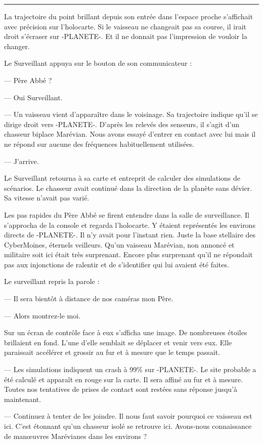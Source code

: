 \documentclass[ebook,12pt,oneside,onecolumn,openright,draft]{memoir}
\begin{document}
\fancybreak{\pfbreakdisplay}

La trajectoire du point brillant depuis son entrée dans l'espace proche
s'affichait avec précision sur l'holocarte. Si le vaisseau ne changeait pas sa
course, il irait droit s'écraser sur -PLANETE-. Et il ne donnait pas
l'impression de vouloir la changer.

Le Surveillant appuya sur le bouton de son communicateur :

  --- Père Abbé ?

  --- Oui Surveillant.

  --- Un vaisseau vient d'apparaître dans le voisinage. Sa trajectoire indique
qu'il se dirige droit vers -PLANETE-. D'après les relevés des senseurs, il
s'agit d'un chasseur biplace Marévian. Nous avons essayé d'entrer en contact
avec lui mais il ne répond sur aucune des fréquences habituellement utilisées.

  --- J'arrive.

Le Surveillant retourna à sa carte et entreprit de calculer des simulations
de scénarios. Le chasseur avait continué dans la direction de la planète sans
dévier. Sa vitesse n'avait pas varié.

Les pas rapides du Père Abbé se firent entendre dans la salle de surveillance.
Il s'approcha de la console et regarda l'holocarte. Y étaient représentés les
environs directs de -PLANETE-. Il n'y avait pour l'instant rien. Juste la base
stellaire des CyberMoines, éternels veilleurs. Qu'un vaisseau Marévian, non
annoncé et militaire soit ici était très surprenant. Encore plus surprenant
qu'il ne répondait pas aux injonctions de ralentir et de s'identifier qui lui
avaient été faites.

Le surveillant repris la parole :

  --- Il sera bientôt à distance de nos caméras mon Père.

  --- Alors montrez-le moi.

Sur un écran de contrôle face à eux s'afficha une image. De nombreuses étoiles
brillaient en fond. L'une d'elle semblait se déplacer et venir vers eux. Elle
paraissait accélérer et grossir au fur et à mesure que le temps passait.

  --- Les simulations indiquent un crash à 99\% sur -PLANETE-. Le site probable
 a été calculé et apparaît en rouge sur la carte. Il sera affiné au fur et à
 mesure. Toutes nos tentatives de prises de contact sont restées sans réponse
 jusqu'à maintenant.

   --- Continuez à tenter de les joindre. Il nous faut savoir pourquoi ce
vaisseau est ici. C'est étonnant qu'un chasseur isolé se retrouve ici.
Avons-nous connaissance de manœuvres Marévianes dans les environs ?
\end{document}
